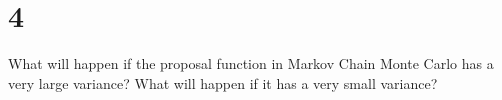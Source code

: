\section{4}

What will happen if the proposal function in Markov Chain Monte Carlo has a very large variance? What will happen if it has a very small variance?

